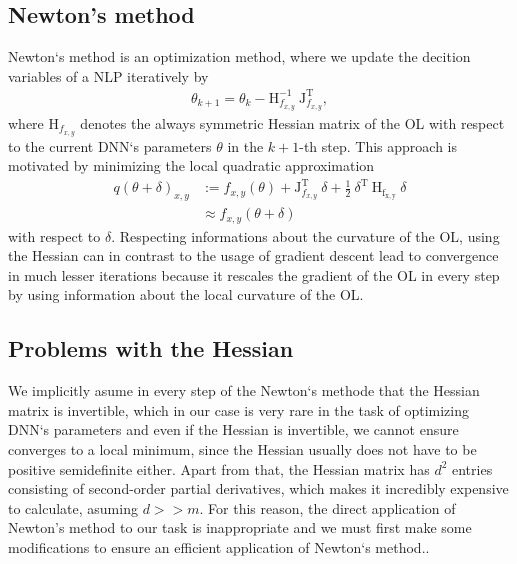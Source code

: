 \documentclass[conference]{IEEEtran}
\begin{document}
\subsection{Newton's method}\label{AA}
Newton`s method is an optimization method, where we update the decition variables of a NLP iteratively by
\begin{align}
 \theta_{k+1} = \theta_{k} -\mathrm{H}_{f_{x, y}}^{-1}\:\mathrm{J}_{f_{x, y}}^{\mathrm{T}},
\end{align}
where $\mathrm{H}_{f_{x, y}}$ denotes the always symmetric Hessian matrix of the OL with respect to the current DNN`s parameters $\theta$ in the $k+1$-th step. This approach is motivated by minimizing the local quadratic approximation
\begin{align}
q(\theta + \delta)_{x, y} &:= f_{x, y}(\theta) + \mathrm{J}_{f_{x, y}}^{\mathrm{T}}\:\delta + \frac{1}{2}\:\delta^{\mathrm{T}}\:\mathrm{H_{f_{x, y}}}\:\delta\\
&\approx f_{x, y}(\theta + \delta)
\end{align}
with respect to $\delta$. 
Respecting informations about the curvature of the OL, using the Hessian can in contrast to the usage of gradient descent lead to convergence in much lesser iterations because it rescales the gradient of the OL in every step by using information about the local curvature of the OL.

\subsection{Problems with the Hessian}
We implicitly asume in every step of the Newton`s methode that the Hessian matrix is invertible, which in our case is very rare in the task of optimizing DNN`s parameters and even if the Hessian is invertible, we cannot ensure converges to a local minimum, since the Hessian usually does not have to be positive semidefinite either. Apart from that, the Hessian matrix has $d^{2}$ entries consisting of second-order partial derivatives, which makes it incredibly expensive to calculate, asuming $d>>m$. For this reason, the direct application of Newton's method to our task is inappropriate and we must first make some modifications to ensure an efficient application of Newton`s method..
\end{document}
